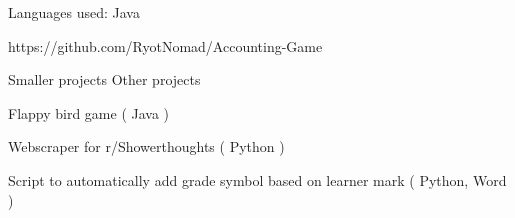 \documentclass[]{awesome-cv}
\begin{document}
\begin{cventries}
{\begin{cvitems}
		\item {Languages used: Java}
		\item {https://github.com/RyotNomad/Accounting-Game}
		\end{cvitems}}
	\cventry
	{Smaller projects}
	{Other projects}
	{}
	{}
	{\begin{cvitems}
		\item {Flappy bird game ( Java )}
		\item {Webscraper for r/Showerthoughts ( Python )}
		\item {Script to automatically add grade symbol based on learner mark ( Python, Word )}
		\end{cvitems}}
\end{cventries}

\vspace{-3mm}
\end{document}
